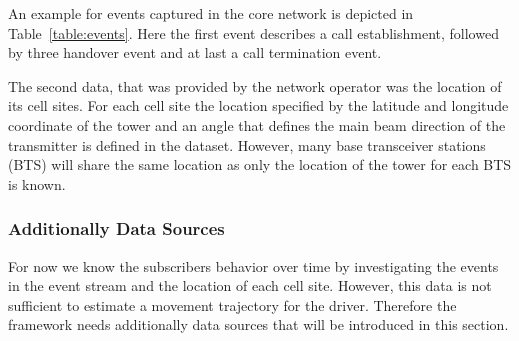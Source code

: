 \documentclass[twocolumn]{bmcart}%
\begin{document}
An example for events captured in the core network is depicted in Table~\ref{table:events}. Here the first event describes a call establishment, followed by three handover event and at last a call termination event.
\newline
%
%
%

The second data, that was provided by the network operator was the location of its cell sites. For each cell site the location specified by the latitude and longitude coordinate of the tower and an angle that defines the main beam direction of the transmitter is defined in the dataset. However, many base transceiver stations (BTS) will share the same location as only the location of the tower for each BTS is known.

\subsubsection*{Additionally Data Sources}
For now we know the subscribers behavior over time by investigating the events in the event stream and the location of each cell site. However, this data is not sufficient to estimate a movement trajectory for the driver. Therefore the framework needs additionally data sources that will be introduced in this section.
\end{document}
